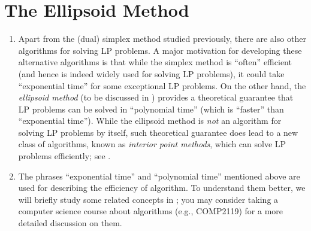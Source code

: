 \section{The Ellipsoid Method}
\label{sect:ellipsoid-method}
\begin{enumerate}
\item Apart from the (dual) simplex method studied previously, there are also
other algorithms for solving LP problems. A major motivation for developing
these alternative algorithms is that while the simplex method is ``often''
efficient (and hence is indeed widely used for solving LP problems), it could
take ``exponential time'' for some exceptional LP problems. On the other
hand, the \emph{ellipsoid method} (to be discussed in
) provides a theoretical guarantee that
LP problems can be solved in ``polynomial time'' (which is ``faster'' than
``exponential time''). While the ellipsoid method is \emph{not} an algorithm
for solving LP problems by itself, such theoretical guarantee does lead to a
new class of algorithms, known as \emph{interior point methods}, which can
solve LP problems efficiently; see .

\item The phrases ``exponential time'' and ``polynomial time'' mentioned above are
used for describing the efficiency of algorithm. To understand them better, we
will briefly study some related concepts in ; you
may consider taking a computer science course about algorithms (e.g., COMP2119)
for a more detailed discussion on them.
\end{enumerate}
